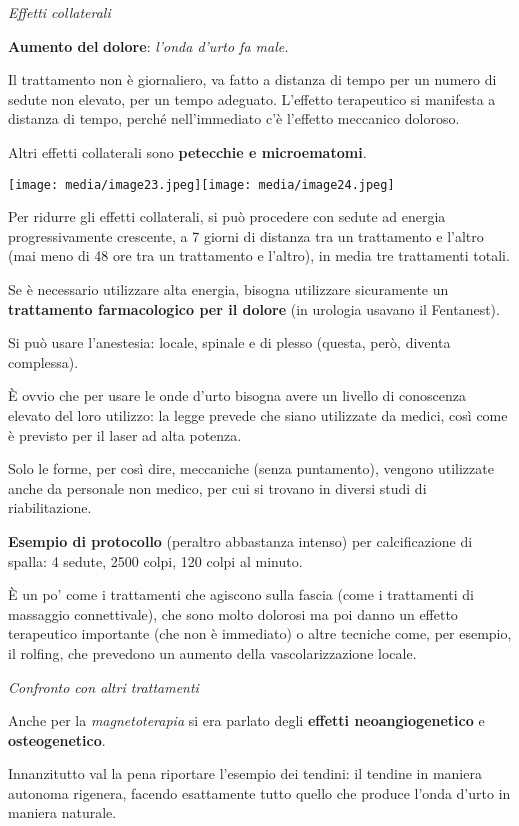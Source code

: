 \documentclass[]{article}
\begin{document}
\emph{Effetti collaterali}

\textbf{Aumento del} \textbf{dolore}: \emph{l'onda d'urto fa male.}

Il trattamento non è giornaliero, va fatto a distanza di tempo per un
numero di sedute non elevato, per un tempo adeguato. L'effetto
terapeutico si manifesta a distanza di tempo, perché nell'immediato c'è
l'effetto meccanico doloroso.

Altri effetti collaterali sono \textbf{petecchie e microematomi}.

\texttt{[image: media/image23.jpeg]}\texttt{[image: media/image24.jpeg]}

Per ridurre gli effetti collaterali, si può procedere con sedute ad
energia progressivamente crescente, a 7 giorni di distanza tra un
trattamento e l'altro (mai meno di 48 ore tra un trattamento e l'altro),
in media tre trattamenti totali.

Se è necessario utilizzare alta energia, bisogna utilizzare sicuramente
un \textbf{trattamento farmacologico per il dolore} (in urologia usavano
il Fentanest).

Si può usare l'anestesia: locale, spinale e di plesso (questa, però,
diventa complessa).

È ovvio che per usare le onde d'urto bisogna avere un livello di
conoscenza elevato del loro utilizzo: la legge prevede che siano
utilizzate da medici, così come è previsto per il laser ad alta potenza.

Solo le forme, per così dire, meccaniche (senza puntamento), vengono
utilizzate anche da personale non medico, per cui si trovano in diversi
studi di riabilitazione.

\textbf{Esempio di protocollo} (peraltro abbastanza intenso) per
calcificazione di spalla: 4 sedute, 2500 colpi, 120 colpi al minuto.

È un po' come i trattamenti che agiscono sulla fascia (come i
trattamenti di massaggio connettivale), che sono molto dolorosi ma poi
danno un effetto terapeutico importante (che non è immediato) o altre
tecniche come, per esempio, il rolfing, che prevedono un aumento della
vascolarizzazione locale.

\emph{Confronto con altri trattamenti}

Anche per la \emph{magnetoterapia} si era parlato degli \textbf{effetti
neoangiogenetico} e \textbf{osteogenetico}.

Innanzitutto val la pena riportare l'esempio dei tendini: il tendine in
maniera autonoma rigenera, facendo esattamente tutto quello che produce
l'onda d'urto in maniera naturale.
\end{document}
